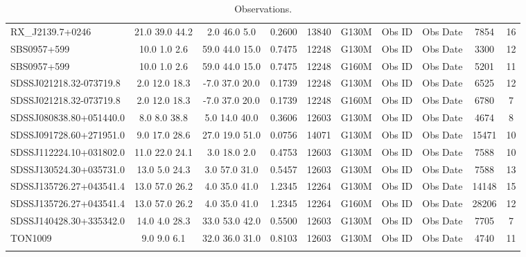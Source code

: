 \documentclass[iop]{emulateapj-rtx4}
\begin{document}
\begin{table}[ht]
\begin{center}
\begin{tabular}{l c c c c c c c c c}
RX\_J2139.7+0246  &         21.0  39.0  44.2  &   2.0  46.0  5.0  &      0.2600  & 13840  &   G130M  &   Obs ID  & Obs Date  & 7854  &       16         \\
SBS0957+599  &             10.0  1.0  2.6  &     59.0  44.0  15.0  &    0.7475  & 12248  &   G130M  &   Obs ID  & Obs Date  & 3300  &       12         \\
SBS0957+599  &             10.0  1.0  2.6  &     59.0  44.0  15.0  &    0.7475  & 12248  &   G160M  &   Obs ID  & Obs Date  & 5201  &       11         \\
SDSSJ021218.32-073719.8  & 2.0  12.0  18.3  &    -7.0  37.0  20.0  &    0.1739  & 12248  &   G130M  &   Obs ID  & Obs Date  & 6525  &       12         \\
SDSSJ021218.32-073719.8  & 2.0  12.0  18.3  &    -7.0  37.0  20.0  &    0.1739  & 12248  &   G160M  &   Obs ID  & Obs Date  & 6780  &       7          \\
SDSSJ080838.80+051440.0  & 8.0  8.0  38.8  &     5.0  14.0  40.0  &     0.3606  & 12603  &   G130M  &   Obs ID  & Obs Date  & 4674  &       8          \\
SDSSJ091728.60+271951.0  & 9.0  17.0  28.6  &    27.0  19.0  51.0  &    0.0756  & 14071  &   G130M  &   Obs ID  & Obs Date  & 15471  &      10         \\
SDSSJ112224.10+031802.0  & 11.0  22.0  24.1  &   3.0  18.0  2.0  &      0.4753  & 12603  &   G130M  &   Obs ID  & Obs Date  & 7588  &       10         \\
SDSSJ130524.30+035731.0  & 13.0  5.0  24.3  &    3.0  57.0  31.0  &     0.5457  & 12603  &   G130M  &   Obs ID  & Obs Date  & 7588  &       13         \\
SDSSJ135726.27+043541.4  & 13.0  57.0  26.2  &   4.0  35.0  41.0  &     1.2345  & 12264  &   G130M  &   Obs ID  & Obs Date  & 14148  &      15         \\
SDSSJ135726.27+043541.4  & 13.0  57.0  26.2  &   4.0  35.0  41.0  &     1.2345  & 12264  &   G160M  &   Obs ID  & Obs Date  & 28206  &      12         \\
SDSSJ140428.30+335342.0  & 14.0  4.0  28.3  &    33.0  53.0  42.0  &    0.5500  & 12603  &   G130M  &   Obs ID  & Obs Date  & 7705  &       7          \\
TON1009  &                 9.0  9.0  6.1  &      32.0  36.0  31.0  &    0.8103  & 12603  &   G130M  &   Obs ID  & Obs Date  & 4740  &       11         \\

 \\
\hline

\end{tabular}
\end{center}
  \caption{\small{Observations.}}
  \label{target_table}
\end{table}
\end{document}
